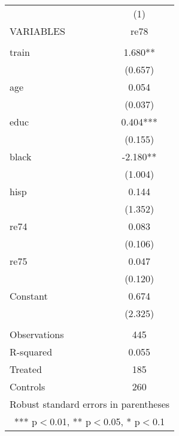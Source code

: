 \documentclass[]{article}
\begin{document}
\begin{tabular}{lc} \hline
 & (1) \\
VARIABLES & re78 \\ \hline
 &  \\
train & 1.680** \\
 & (0.657) \\
age & 0.054 \\
 & (0.037) \\
educ & 0.404*** \\
 & (0.155) \\
black & -2.180** \\
 & (1.004) \\
hisp & 0.144 \\
 & (1.352) \\
re74 & 0.083 \\
 & (0.106) \\
re75 & 0.047 \\
 & (0.120) \\
Constant & 0.674 \\
 & (2.325) \\
 &  \\
Observations & 445 \\
R-squared & 0.055 \\
Treated & 185 \\
 Controls & 260 \\ \hline
\multicolumn{2}{c}{ Robust standard errors in parentheses} \\
\multicolumn{2}{c}{ *** p$<$0.01, ** p$<$0.05, * p$<$0.1} \\
\end{tabular}
\end{document}
